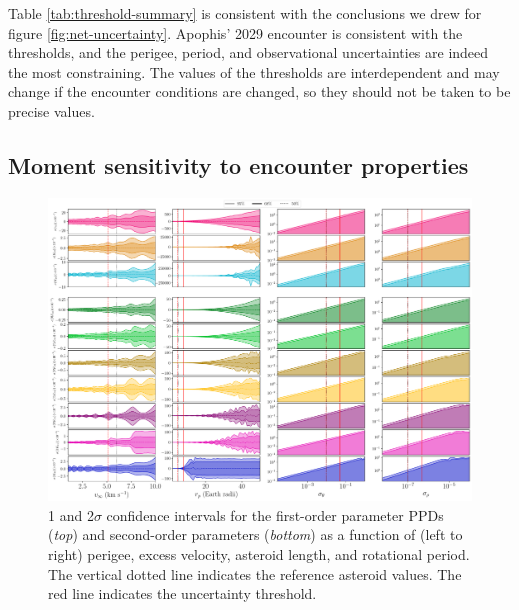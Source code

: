 \documentclass[fleqn,usenatbib]{mnras}
\begin{document}
Table \ref{tab:threshold-summary} is consistent with the conclusions we drew for figure \ref{fig:net-uncertainty}. Apophis' 2029 encounter is consistent with the thresholds, and the perigee, period, and observational uncertainties are indeed the most constraining. The values of the thresholds are interdependent and may change if the encounter conditions are changed, so they should not be taken to be precise values.


\subsection{Moment sensitivity to encounter properties}
\label{sec:moment-uncertainty}

\begin{figure}
  \centering
  \includegraphics[angle=90, origin=c, width=0.98\linewidth]{figs/scan-all1.pdf}
  \caption{1 and 2$\sigma$ confidence intervals for the first-order parameter PPDs (\textit{top}) and second-order parameters (\textit{bottom}) as a function of (left to right) perigee, excess velocity, asteroid length, and rotational period. The vertical dotted line indicates the reference asteroid values. The red line indicates the uncertainty threshold.}
  \label{fig:scan-perigee}
  \label{fig:scan-vex}
  \label{fig:scan-am}
  \label{fig:scan-period}
  \label{fig:scan-physical}
\end{figure}
\end{document}
